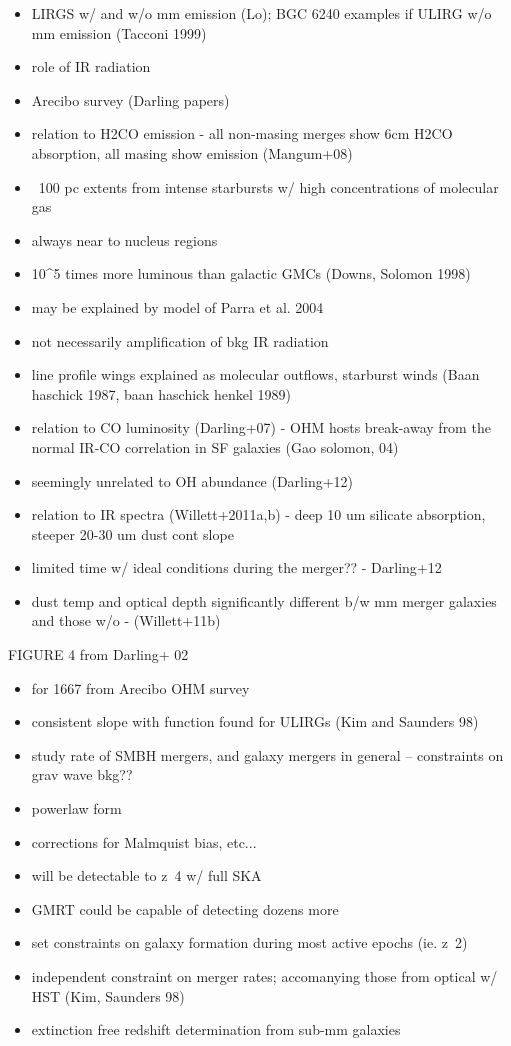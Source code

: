 \begin{itemize}
\item LIRGS w/ and w/o mm emission (Lo); BGC 6240 examples if ULIRG w/o mm emission (Tacconi 1999)
\item role of IR radiation
\item Arecibo survey (Darling papers)
\item relation to H2CO emission - all non-masing merges show 6cm H2CO absorption, all masing show emission (Mangum+08)
\item ~100 pc extents from intense starbursts w/ high concentrations of molecular gas
\item always near to nucleus regions
\item 10^5 times more luminous than galactic GMCs (Downs, Solomon 1998)
\item may be explained by model of Parra et al. 2004
\item not necessarily amplification of bkg IR radiation
\item line profile wings explained as molecular outflows, starburst winds (Baan haschick 1987, baan haschick henkel 1989)
\item relation to CO luminosity (Darling+07) - OHM hosts break-away from the normal IR-CO correlation in SF galaxies (Gao solomon, 04)
\item seemingly unrelated to OH abundance  (Darling+12)
\item relation to IR spectra (Willett+2011a,b) - deep 10 um silicate absorption, steeper 20-30 um dust cont slope
\item limited time w/ ideal conditions during the merger?? - Darling+12
\item dust temp and optical depth significantly different b/w mm merger galaxies and those w/o - (Willett+11b)
\end{itemize}

FIGURE 4 from Darling+ 02

\begin{itemize}
\item for 1667 from Arecibo OHM survey
\item consistent slope with function found for ULIRGs (Kim and Saunders 98)
\item study rate of SMBH mergers, and galaxy mergers in general -- constraints on grav wave bkg??
\item powerlaw form
\item corrections for Malmquist bias, etc...
\item will be detectable to z~4 w/ full SKA
\item GMRT could be capable of detecting dozens more
\item set constraints on galaxy formation during most active epochs (ie. z~2)
\item independent constraint on merger rates; accomanying those from optical w/ HST (Kim, Saunders 98)
\item extinction free redshift determination from sub-mm galaxies
\end{itemize}

